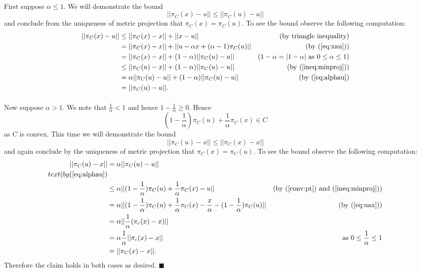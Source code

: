 \documentclass[letterpaper,12pt,oneside,onecolumn]{article}
\begin{document}
\paragraph{}
First suppose $\alpha \leq 1$. We will demonstrate the bound $$||\pi_C(x)-u|| \leq ||\pi_C(u) - u||$$ and conclude from the uniqueness of metric projection that $\pi_C(x) = \pi_C(u)$.  To see the bound observe the following computation:
\begin{align*}
||\pi_C(x) - u|| &\leq ||\pi_C(x) - x|| + ||x-u|| &\text{(by triangle inequality)} \\
&= ||\pi_C(x) - x|| + ||u - \alpha x + (\alpha-1)\pi_C(u)|| &\text{(by (\ref{eq:xau}))}\\
&= ||\pi_C(x) - x|| + (1-\alpha) ||\pi_C(u) - u|| &\text{($1-\alpha =|1-\alpha|$ as $0\leq\alpha \leq 1$)}\\
&\leq ||\pi_C(u) - x|| + (1-\alpha) ||\pi_C(u) - u|| &\text{(by (\ref{ineq:minproj}))} \\
&= \alpha ||\pi_C(u) - u|| + (1-\alpha)||\pi_C(u) - u|| &\text{(by (\ref{eq:alphau})}\\
&= ||\pi_C(u) - u||.
\end{align*}
\paragraph{}
Now suppose $\alpha > 1$. We note that $\frac{1}{\alpha} < 1$ and hence $1-\frac{1}{\alpha} \geq 0$. Hence
\begin{equation}
(1-\frac{1}{\alpha}) \pi_C(u) + \frac{1}{\alpha} \pi_C(x) \in C
\label{conv:pt}\end{equation}
as $C$ is convex. This time we will demonstrate the bound $$||\pi_C(u) - x|| \leq ||\pi_C(x) - x||$$ and again conclude by the uniqueness of metric projection that $\pi_C(x) = \pi_C(u)$. To see the bound observe the following computation:
\begin{align*}
||\pi_C(u) - x|| &= \alpha ||\pi_C(u) - u|| &\\text{(by (\ref{eq:alphau}) }\\
&\leq \alpha||(1-\frac{1}{\alpha}) \pi_C(u) + \frac{1}{\alpha} \pi_C(x) - u|| &\text{(by (\ref{conv:pt}) and (\ref{ineq:minproj}))}\\
&= \alpha||(1-\frac{1}{\alpha}) \pi_C(u) + \frac{1}{\alpha} \pi_C(x) - \frac{x}{\alpha} - (1-\frac{1}{\alpha})\pi_C(u)|| &\text{(by (\ref{eq:uax}))} \\
&=\alpha||\frac{1}{\alpha}(\pi_c(x) -x)|| \\
&=\alpha\frac{1}{\alpha}||\pi_c(x) -x|| &\text{as $0\leq \frac{1}{\alpha} \leq 1$} \\
&=||\pi_C(x) - x||.
\end{align*}
Therefore the claim holds in both cases as desired. $\blacksquare$
\end{document}

